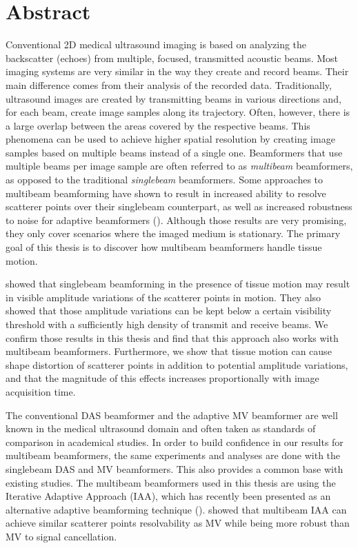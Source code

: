 
\chapter*{Abstract}
Conventional 2D medical ultrasound imaging is based on analyzing the backscatter 
(echoes) from multiple, focused, transmitted acoustic beams.
Most imaging systems are very similar in the way they create and record beams. Their main difference comes from their analysis of the recorded data.
Traditionally, ultrasound images are created by transmitting beams in various directions and, for each beam, create image samples along its trajectory.
Often, however, there is a large overlap between the areas covered by the respective beams.
This phenomena can be used to achieve higher spatial resolution by creating image samples based on multiple beams instead of a single one.
Beamformers that use multiple beams per image sample are often referred to as \textit{multibeam} beamformers, as opposed to the traditional \textit{singlebeam} beamformers.
Some approaches to multibeam beamforming have shown to result in increased ability to resolve scatterer points over their singlebeam counterpart, as well as increased robustness to noise for adaptive beamformers (\cite{Jensen_multibeam}).
Although those results are very promising, they only cover scenarios where the imaged medium is stationary.
The primary goal of this thesis is to discover how multibeam beamformers handle tissue motion.

\cite{Asen_shift_invariance} showed that singlebeam beamforming in the presence of tissue motion may result in visible amplitude variations of the scatterer points in motion. 
They also showed that those amplitude variations can be kept below a certain visibility threshold with a sufficiently high density of transmit and receive beams.
We confirm those results in this thesis and find that this approach also works with multibeam beamformers.
Furthermore, we show that tissue motion can cause shape distortion of scatterer points in addition to potential amplitude variations, and that the magnitude of this effects increases proportionally with image acquisition time.

The conventional DAS beamformer and the adaptive MV beamformer are well known in the medical ultrasound domain and often taken as standards of comparison in academical studies.
In order to build confidence in our results for multibeam beamformers, the same experiments and analyses are done with the singlebeam DAS and MV beamformers. This also provides a common base with existing studies.
The multibeam beamformers used in this thesis are using the Iterative Adaptive Approach (IAA), which has recently been presented as an alternative adaptive beamforming technique (\cite{Yardibi}).
\cite{Jensen_IAA} showed that multibeam IAA can achieve similar scatterer points resolvability as MV while being more robust than MV to signal cancellation.

